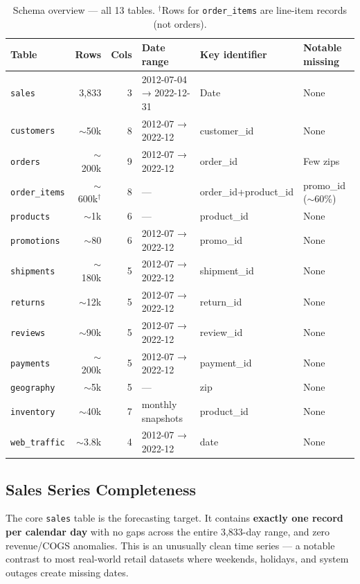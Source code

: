 \documentclass{article}
\begin{document}
\begin{table}[H]
\centering
\caption{Schema overview — all 13 tables.
$^\dagger$Rows for \texttt{order\_items} are line-item records (not orders).}
\label{tab:schema}
\small
\begin{tabular}{lrrlll}
\toprule
\textbf{Table} & \textbf{Rows} & \textbf{Cols} & \textbf{Date range}
  & \textbf{Key identifier} & \textbf{Notable missing} \\
\midrule
\texttt{sales}       & 3,833   & 3  & 2012-07-04 → 2022-12-31 & Date          & None \\
\texttt{customers}   & $\sim$50k   & 8  & 2012-07 → 2022-12       & customer\_id  & None \\
\texttt{orders}      & $\sim$200k  & 9  & 2012-07 → 2022-12       & order\_id     & Few zips \\
\texttt{order\_items}& $\sim$600k$^\dagger$ & 8 & — & order\_id+product\_id & promo\_id ($\sim$60\%) \\
\texttt{products}    & $\sim$1k    & 6  & —                       & product\_id   & None \\
\texttt{promotions}  & $\sim$80    & 6  & 2012-07 → 2022-12       & promo\_id     & None \\
\texttt{shipments}   & $\sim$180k  & 5  & 2012-07 → 2022-12       & shipment\_id  & None \\
\texttt{returns}     & $\sim$12k   & 5  & 2012-07 → 2022-12       & return\_id    & None \\
\texttt{reviews}     & $\sim$90k   & 5  & 2012-07 → 2022-12       & review\_id    & None \\
\texttt{payments}    & $\sim$200k  & 5  & 2012-07 → 2022-12       & payment\_id   & None \\
\texttt{geography}   & $\sim$5k    & 5  & —                       & zip           & None \\
\texttt{inventory}   & $\sim$40k   & 7  & monthly snapshots        & product\_id   & None \\
\texttt{web\_traffic}& $\sim$3.8k  & 4  & 2012-07 → 2022-12       & date          & None \\
\bottomrule
\end{tabular}
\end{table}

\subsection{Sales Series Completeness}

The core \texttt{sales} table is the forecasting target.
It contains \textbf{exactly one record per calendar day} with no gaps across the
entire 3,833-day range, and zero revenue/COGS anomalies.
This is an unusually clean time series — a notable contrast to most real-world
retail datasets where weekends, holidays, and system outages create missing dates.
\end{document}
